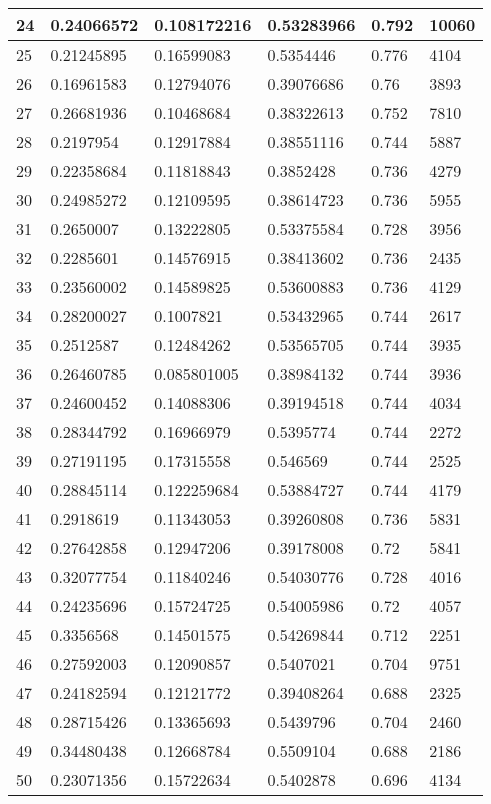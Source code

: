 \begin{longtable}{|l|l|l|l|l|l|}
24 & 0.24066572 & 0.108172216 & 0.53283966 & 0.792 & 10060 \\ \hline 
25 & 0.21245895 & 0.16599083 & 0.5354446 & 0.776 & 4104 \\ \hline 
26 & 0.16961583 & 0.12794076 & 0.39076686 & 0.76 & 3893 \\ \hline 
27 & 0.26681936 & 0.10468684 & 0.38322613 & 0.752 & 7810 \\ \hline 
28 & 0.2197954 & 0.12917884 & 0.38551116 & 0.744 & 5887 \\ \hline 
29 & 0.22358684 & 0.11818843 & 0.3852428 & 0.736 & 4279 \\ \hline 
30 & 0.24985272 & 0.12109595 & 0.38614723 & 0.736 & 5955 \\ \hline 
31 & 0.2650007 & 0.13222805 & 0.53375584 & 0.728 & 3956 \\ \hline 
32 & 0.2285601 & 0.14576915 & 0.38413602 & 0.736 & 2435 \\ \hline 
33 & 0.23560002 & 0.14589825 & 0.53600883 & 0.736 & 4129 \\ \hline 
34 & 0.28200027 & 0.1007821 & 0.53432965 & 0.744 & 2617 \\ \hline 
35 & 0.2512587 & 0.12484262 & 0.53565705 & 0.744 & 3935 \\ \hline 
36 & 0.26460785 & 0.085801005 & 0.38984132 & 0.744 & 3936 \\ \hline 
37 & 0.24600452 & 0.14088306 & 0.39194518 & 0.744 & 4034 \\ \hline 
38 & 0.28344792 & 0.16966979 & 0.5395774 & 0.744 & 2272 \\ \hline 
39 & 0.27191195 & 0.17315558 & 0.546569 & 0.744 & 2525 \\ \hline 
40 & 0.28845114 & 0.122259684 & 0.53884727 & 0.744 & 4179 \\ \hline 
41 & 0.2918619 & 0.11343053 & 0.39260808 & 0.736 & 5831 \\ \hline 
42 & 0.27642858 & 0.12947206 & 0.39178008 & 0.72 & 5841 \\ \hline 
43 & 0.32077754 & 0.11840246 & 0.54030776 & 0.728 & 4016 \\ \hline 
44 & 0.24235696 & 0.15724725 & 0.54005986 & 0.72 & 4057 \\ \hline 
45 & 0.3356568 & 0.14501575 & 0.54269844 & 0.712 & 2251 \\ \hline 
46 & 0.27592003 & 0.12090857 & 0.5407021 & 0.704 & 9751 \\ \hline 
47 & 0.24182594 & 0.12121772 & 0.39408264 & 0.688 & 2325 \\ \hline 
48 & 0.28715426 & 0.13365693 & 0.5439796 & 0.704 & 2460 \\ \hline 
49 & 0.34480438 & 0.12668784 & 0.5509104 & 0.688 & 2186 \\ \hline 
50 & 0.23071356 & 0.15722634 & 0.5402878 & 0.696 & 4134 \\ \hline 
\end{longtable}